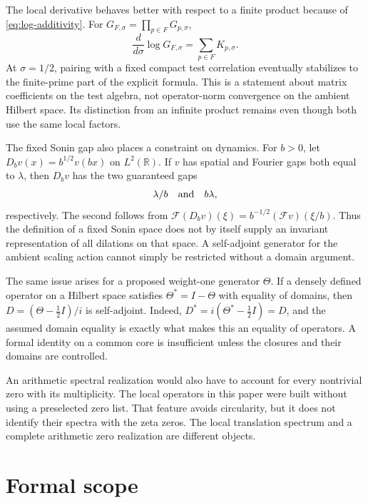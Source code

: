 \documentclass[11pt,letterpaper]{article}
\theoremstyle{definition}
\theoremstyle{remark}
\newcommand{\R}{\mathbb R}
\begin{document}
The local derivative behaves better with respect to a finite
product because of \eqref{eq:log-additivity}. For
$G_{F,\sigma}=\prod_{p\in F}G_{p,\sigma}$,
\begin{equation}\label{eq:finite-log-sum}
 \frac{d}{d\sigma}\log G_{F,\sigma}
       =\sum_{p\in F}K_{p,\sigma}.
\end{equation}
At $\sigma=1/2$, pairing with a fixed compact test correlation
eventually stabilizes to the finite-prime part of the explicit
formula. This is a statement about matrix coefficients on the
test algebra, not operator-norm convergence on the ambient
Hilbert space. Its distinction from an infinite product remains
even though both use the same local factors.

The fixed Sonin gap also places a constraint on dynamics.
For $b>0$, let $D_bv(x)=b^{1/2}v(bx)$ on $L^2(\R)$.
If $v$ has spatial and Fourier gaps both equal to $\lambda$,
then $D_bv$ has the two guaranteed gaps
\begin{equation}\label{eq:dilation-gaps}
 \lambda/b\quad\hbox{and}\quad b\lambda,
\end{equation}
respectively. The second follows from
$\mathscr F(D_bv)(\xi)=b^{-1/2}(\mathscr Fv)(\xi/b)$.
Thus the definition of a fixed Sonin space does not by itself
supply an invariant representation of all dilations on that
space. A self-adjoint generator for the ambient scaling action
cannot simply be restricted without a domain argument.

The same issue arises for a proposed weight-one generator
$\Theta$. If a densely defined operator on a Hilbert space
satisfies $\Theta^*=I-\Theta$ with equality of domains, then
$D=(\Theta-\tfrac12I)/i$ is self-adjoint. Indeed,
$D^*=i(\Theta^*-\tfrac12I)=D$, and the assumed domain equality
is exactly what makes this an equality of operators. A formal
identity on a common core is insufficient unless the closures
and their domains are controlled.

An arithmetic spectral realization would also have to account
for every nontrivial zero with its multiplicity. The local
operators in this paper were built without using a preselected
zero list. That feature avoids circularity, but it does not
identify their spectra with the zeta zeros. The local
translation spectrum and a complete arithmetic zero
realization are different objects.

\section{Formal scope}
\end{document}
